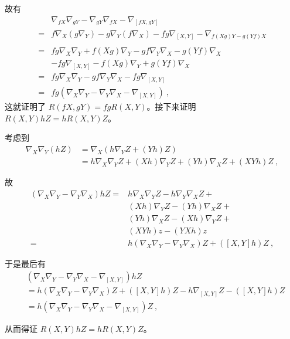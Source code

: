 故有
\begin{equation}
\begin{aligned}
&\nabla_{fX}\nabla_{gY}-\nabla_{gY}\nabla_{fX}-\nabla_{[fX, gY]}\\={}&f\nabla_X(g\nabla_Y)-g\nabla_Y(f\nabla_X)-fg\nabla_{[X, Y]}-\nabla_{f(Xg)Y-g(Yf)X}\\
\\={}&fg\nabla_X\nabla_Y+f(Xg)\nabla_Y-gf\nabla_Y\nabla_X-g(Yf)\nabla_X\\&-fg\nabla_{[X, Y]}-f(Xg)\nabla_Y+g(Yf)\nabla_X\\
={}&fg\nabla_X\nabla_Y-gf\nabla_Y\nabla_X-fg\nabla_{[X, Y]}\\
={}&fg(\nabla_X\nabla_Y-\nabla_Y\nabla_X-\nabla_{[X, Y]})~,
\end{aligned}
\end{equation}
这就证明了 $R(fX, gY)=fgR(X, Y)$。接下来证明 $R(X, Y)hZ=hR(X, Y)Z$。

考虑到
\begin{equation}
\begin{aligned}
\nabla_X\nabla_Y(hZ)&=\nabla_X(h\nabla_YZ+(Yh)Z)\\
&=h\nabla_X\nabla_YZ+(Xh)\nabla_YZ+(Yh)\nabla_XZ+(XYh)Z~,
\end{aligned}
\end{equation}

故
\begin{equation}
\begin{aligned}
(\nabla_X\nabla_Y-\nabla_Y\nabla_X)hZ={}& h\nabla_X\nabla_YZ-h\nabla_Y\nabla_XZ+\\&(Xh)\nabla_YZ-(Yh)\nabla_XZ+\\&(Yh)\nabla_XZ-(Xh)\nabla_YZ+\\&(XYh)z-(YXh)z\\
={}& h(\nabla_X\nabla_Y-\nabla_Y\nabla_X)Z+([X, Y]h)Z~,
\end{aligned}
\end{equation}

于是最后有
\begin{equation}
\begin{aligned}
&(\nabla_X\nabla_Y-\nabla_Y\nabla_X-\nabla_{[X, Y]})hZ\\
&=h(\nabla_X\nabla_Y-\nabla_Y\nabla_X)Z+([X, Y]h)Z-h\nabla_{[X, Y]}Z-([X, Y]h)Z\\
&=h(\nabla_X\nabla_Y-\nabla_Y\nabla_X-\nabla_{[X, Y]})Z~,
\end{aligned}
\end{equation}

从而得证 $R(X, Y)hZ=hR(X, Y)Z$。

